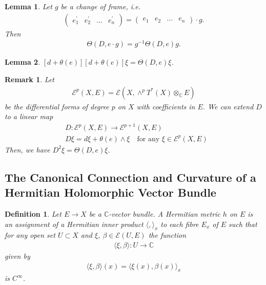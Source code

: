 \documentclass[a4paper,10pt]{amsart}
\newtheorem{definition}{Definition}[section]
\newtheorem{lemma}{Lemma}[section]
\newtheorem{remark}{Remark}[section]
\newcommand{\C}{\mathbb C} %
\newcommand{\E}{\mathcal E}
\begin{document}
\begin{lemma}
    Let $g$ be a change of frame, i.e.
    \begin{align*}
    \begin{pmatrix}
        e_{1}^{'} & e_{2}^{'} & \ldots & e_{n}^{'} 
    \end{pmatrix}= 
    \begin{pmatrix}
        e_{1} & e_{2} & \ldots & e_{n} 
    \end{pmatrix} \cdot g.
    \end{align*} 
     Then
   \begin{align*}
       \Theta(D, e \cdot g) = g^{-1} \Theta(D, e) g. 
   \end{align*}
\end{lemma}

\begin{lemma}
    $[d + \theta(e)][d+ \theta(e)]\xi = \Theta(D, e)\xi$.    
\end{lemma}

\begin{remark}
Let 
\begin{align*}
    \E^{p}(X, E) = \E(X, \wedge^{p}T^{*}(X) \otimes_{\C} E) 
\end{align*}
be the differential forms of degree $p$ on $X$ with coefficients in
$E$.
   We can extend $D$ to a linear map 
   \begin{align*}
       &D : \E^{p}(X,E) \rightarrow \E^{p+1}(X, E)\\
       &D \xi = d\xi + \theta(e) \wedge \xi \quad \mbox{for any $\xi
   \in \E^{p}(X,E)$}
   \end{align*} 
   Then, we have $D^{2}\xi = \Theta(D,e)\xi$. 
\end{remark}


\subsection{The Canonical Connection and Curvature of a Hermitian 
Holomorphic Vector Bundle}

\begin{definition}
   Let $E \rightarrow X$ be a $\C$-vector bundle. A Hermitian metric
   $h$ on $E$ is an assignment of a Hermitian inner product
   $\langle, \rangle_{x}$ to each fibre $E_{x}$ of $E$ such that
   for any open set $U \subset X$ and $\xi$, $\beta \in \E(U, E)$ the
   function
   \begin{align*}
      \langle \xi, \beta \rangle : U \rightarrow \C 
   \end{align*}
   given by 
   \begin{align*}
       \langle \xi, \beta \rangle (x) = \langle \xi(x), \beta(x) \rangle_{x}
   \end{align*}
   is $C^{\infty}$.
\end{definition}
\end{document}
